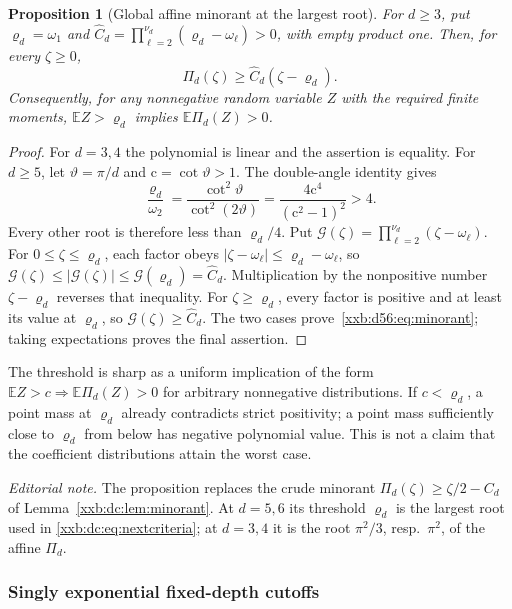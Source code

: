 \documentclass[11pt,a4paper]{article}
\numberwithin{equation}{section}
\newtheorem{proposition}[theorem]{Proposition}
\theoremstyle{definition}
\theoremstyle{remark}
\theoremstyle{plain}
\begin{document}
\begin{proposition}[Global affine minorant at the largest root]\label{xxb:d56:prop:general}
For $d\ge3$, put $\varrho_d=\omega_1$ and
$\widehat C_d=\prod_{\ell=2}^{\nu_d}(\varrho_d-\omega_\ell)>0$, with empty
product one. Then, for every $\zeta\ge0$,
\begin{equation}\label{xxb:d56:eq:minorant}
 \Pi_d(\zeta)\ge\widehat C_d(\zeta-\varrho_d).
\end{equation}
Consequently, for any nonnegative random variable $Z$ with the required finite
moments, $\mathbb E Z>\varrho_d$ implies $\mathbb E\Pi_d(Z)>0$.
\end{proposition}
\begin{proof}
For $d=3,4$ the polynomial is linear and the assertion is equality. For
$d\ge5$, let $\vartheta=\pi/d$ and $\mathrm c=\cot\vartheta>1$. The
double-angle identity gives
\[
 \frac{\varrho_d}{\omega_2}=\frac{\cot^2\vartheta}{\cot^2(2\vartheta)}
 =\frac{4\mathrm c^4}{(\mathrm c^2-1)^2}>4.
\]
Every other root is therefore less than $\varrho_d/4$. Put
$\mathcal G(\zeta)=\prod_{\ell=2}^{\nu_d}(\zeta-\omega_\ell)$. For
$0\le\zeta\le\varrho_d$, each factor obeys
$|\zeta-\omega_\ell|\le\varrho_d-\omega_\ell$, so
$\mathcal G(\zeta)\le|\mathcal G(\zeta)|\le\mathcal G(\varrho_d)=\widehat C_d$.
Multiplication by the nonpositive number $\zeta-\varrho_d$ reverses that
inequality. For $\zeta\ge\varrho_d$, every factor is positive and at least its
value at $\varrho_d$, so $\mathcal G(\zeta)\ge\widehat C_d$. The two cases
prove~\eqref{xxb:d56:eq:minorant}; taking expectations proves the final
assertion.
\end{proof}
The threshold is sharp as a uniform implication of the form
$\mathbb E Z>c\Rightarrow\mathbb E\Pi_d(Z)>0$ for arbitrary nonnegative
distributions. If $c<\varrho_d$, a point mass at $\varrho_d$ already
contradicts strict positivity; a point mass sufficiently close to $\varrho_d$
from below has negative polynomial value. This is not a claim that the
coefficient distributions attain the worst case.

\emph{Editorial note.}  The proposition replaces the crude minorant
$\Pi_d(\zeta)\ge\zeta/2-C_d$ of Lemma~\ref{xxb:dc:lem:minorant}.  At $d=5,6$
its threshold $\varrho_d$ is the largest root used in
\eqref{xxb:dc:eq:nextcriteria}; at $d=3,4$ it is the root $\pi^2/3$, resp.\
$\pi^2$, of the affine $\Pi_d$.

\subsubsection{Singly exponential fixed-depth cutoffs}
\end{document}
